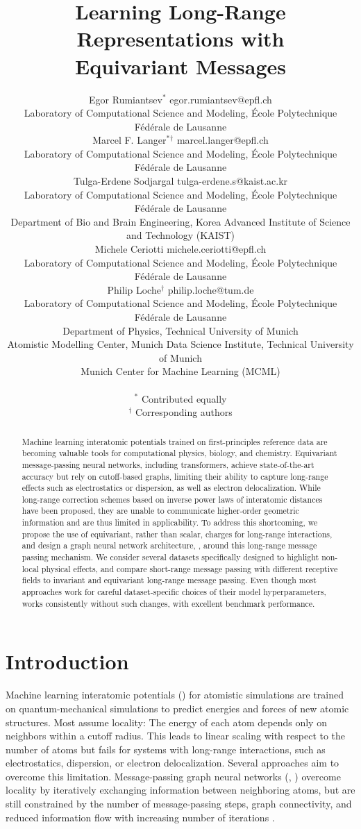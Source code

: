 \documentclass[10pt]{article}
\title{Learning Long-Range Representations with \\Equivariant Messages}
\author{\name Egor Rumiantsev$^*$ \email egor.rumiantsev@epfl.ch \\
    \addr Laboratory of Computational Science and Modeling, École Polytechnique Fédérale de Lausanne\\
    \AND
    \name Marcel F. Langer$^*$$^\dagger$ \email marcel.langer@epfl.ch \\
    \addr Laboratory of Computational Science and Modeling, École Polytechnique Fédérale de Lausanne\\
    \AND
    \name Tulga-Erdene Sodjargal \email tulga-erdene.s@kaist.ac.kr \\
    \addr Laboratory of Computational Science and Modeling, École Polytechnique Fédérale de Lausanne\\
    \addr Department of Bio and Brain Engineering, Korea Advanced Institute of Science and Technology (KAIST) \\
    \AND
    \name Michele Ceriotti \email michele.ceriotti@epfl.ch \\
    \addr Laboratory of Computational Science and Modeling, École Polytechnique Fédérale de Lausanne\\
    \AND
    \name Philip Loche$^\dagger$ \email philip.loche@tum.de \\
    \addr Laboratory of Computational Science and Modeling, École Polytechnique Fédérale de Lausanne\\
    \addr Department of Physics, Technical University of Munich \\
    \addr Atomistic Modelling Center, Munich Data Science Institute, Technical University of Munich \\
    \addr Munich Center for Machine Learning (MCML) \\\\
    $^*$ Contributed equally \\
    $^\dagger$ Corresponding authors
}
\begin{document}
\maketitle

\begin{abstract}
Machine learning interatomic potentials trained on first-principles reference data are becoming valuable tools for computational physics, biology, and chemistry.
Equivariant message-passing neural networks, including transformers, achieve state-of-the-art accuracy but rely on cutoff-based graphs, limiting their ability to capture long-range effects such as electrostatics or dispersion, as well as electron delocalization.
While long-range correction schemes based on inverse power laws of interatomic distances have been proposed, they are unable to communicate higher-order geometric information and are thus limited in applicability.
To address this shortcoming, we propose the use of equivariant, rather than scalar, charges for long-range interactions, and design a graph neural network architecture, \lorem{}, around this long-range message passing mechanism.
We consider several datasets specifically designed to highlight non-local physical effects, and compare short-range message passing with different receptive fields to invariant and equivariant long-range message passing.
Even though most approaches work for careful dataset-specific choices of their model hyperparameters, \lorem{} works consistently without such changes, with excellent benchmark performance.
\end{abstract}

\clearpage

\section{Introduction}

Machine learning interatomic potentials (\mlps) for atomistic simulations are trained on quantum-mechanical simulations to predict energies and forces of new atomic structures. Most \mlps assume locality: The energy of each atom depends only on neighbors within a cutoff radius. This leads to linear scaling with respect to the number of atoms but fails for systems with long-range interactions, such as electrostatics, dispersion, or electron delocalization. \citep{bp2007,kfgb2021,ts2009,gc2019,ucsgpstm2021,hlhc2023}
%
Several approaches aim to overcome this limitation.
Message-passing graph neural networks (\mpnns, \cite{gsrvd2017}) overcome locality by iteratively exchanging information between neighboring atoms, but are still constrained by the number of message-passing steps, graph connectivity, and reduced information flow with increasing number of iterations \citep{cw2020,ay2020,npfc2022}.
\end{document}
